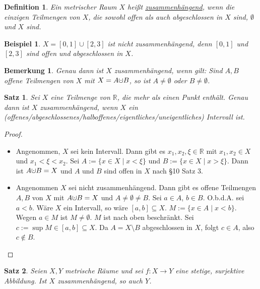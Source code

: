 \documentclass[10pt,a4paper]{report}
\newtheorem{satz}{Satz}
\newtheorem*{defi}{Definition}
\newtheorem*{remark}{Bemerkung}
\newtheorem*{example}{Beispiel}
\newcommand{\dotcup}{\ensuremath{\mathaccent\cdot\cup}}
\begin{document}
\begin{defi}
  Ein metrischer Raum $X$ heißt \underline{zusammenhängend}, wenn die einzigen Teilmengen von $X$, die sowohl offen als auch abgeschlossen in $X$ sind, $\emptyset$ und $X$ sind.
\end{defi}

\begin{example}
  $X = [0, 1] \cup [2, 3]$ ist nicht zusammenhängend, denn $[0, 1]$ und $[2, 3]$ sind offen und abgeschlossen in $X$.
\end{example}

\begin{remark}
  Genau dann ist $X$ zusammenhängend, wenn gilt:
  Sind $A, B$ offene Teilmengen von $X$ mit $X = A \dotcup B$, so ist $A \ne \emptyset$ oder $B \ne \emptyset$.
\end{remark}

\begin{satz}
  Sei $X$ eine Teilmenge von $\mathbb{R}$, die mehr als einen Punkt enthält.
  Genau dann ist $X$ zusammenhängend, wenn $X$ ein (offenes/abgeschlossenes/halboffenes/eigentliches/uneigentliches) Intervall ist.
\end{satz}

\begin{proof}
  \begin{itemize}
  \item Angenommen, $X$ sei kein Intervall.
    Dann gibt es $x_{1}, x_{2}, \xi \in \mathbb{R}$ mit $x_{1}, x_{2} \in X$ und $x_{1} < \xi < x_{2}$.
    Sei $A := \{ x \in X \mid x < \xi \}$ und $B := \{ x \in X \mid x > \xi \}$.
    Dann ist $A \dotcup B = X$ und $A$ und $B$ sind offen in $X$ nach §10 Satz 3.
  \item Angenommen $X$ sei nicht zusammenhängend.
    Dann gibt es offene Teilmengen $A, B$ von $X$ mit $A \dotcup B = X$ und $A \ne \emptyset \ne B$.
    Sei $a \in A$, $b \in B$.
    O.b.d.A. sei $a < b$.
    Wäre $X$ ein Intervall, so wäre $[a, b] \subseteq X$.
    $M := \{ x \in A \mid x < b \}$.
    Wegen $a \in M$ ist $M \ne \emptyset$.
    $M$ ist nach oben beschränkt.
    Sei $c := \sup M \in [a, b] \subseteq X$.
    Da $A = X \setminus B$ abgeschlossen in $X$, folgt $c \in A$, also $c \notin B$.
  \end{itemize}
\end{proof}

\begin{satz}
  Seien $X, Y$ metrische Räume und sei $f : X \rightarrow Y$ eine stetige, surjektive Abbildung.
  Ist $X$ zusammenhängend, so auch $Y$.
\end{satz}
\end{document}
